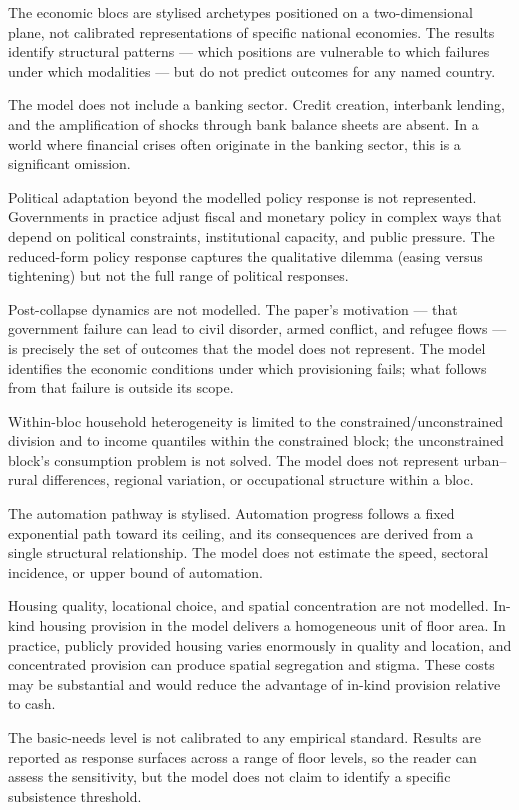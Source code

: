 \documentclass[preprint,review,12pt]{elsarticle}
\begin{document}
The economic blocs are stylised archetypes positioned on a
two-dimensional plane, not calibrated representations of specific
national economies. The results identify structural patterns --- which
positions are vulnerable to which failures under which modalities ---
but do not predict outcomes for any named country.

The model does not include a banking sector. Credit creation, interbank
lending, and the amplification of shocks through bank balance sheets are
absent. In a world where financial crises often originate in the banking
sector, this is a significant omission.

Political adaptation beyond the modelled policy response is not
represented. Governments in practice adjust fiscal and monetary policy
in complex ways that depend on political constraints, institutional
capacity, and public pressure. The reduced-form policy response captures
the qualitative dilemma (easing versus tightening) but not the full
range of political responses.

Post-collapse dynamics are not modelled. The paper's motivation --- that
government failure can lead to civil disorder, armed conflict, and
refugee flows --- is precisely the set of outcomes that the model does
not represent. The model identifies the economic conditions under which
provisioning fails; what follows from that failure is outside its scope.

Within-bloc household heterogeneity is limited to the
constrained/unconstrained division and to income quantiles within the
constrained block; the unconstrained block's consumption problem is not
solved. The model does not represent urban--rural differences, regional
variation, or occupational structure within a bloc.

The automation pathway is stylised. Automation progress follows a fixed
exponential path toward its ceiling, and its consequences are derived
from a single structural relationship. The model does not estimate the
speed, sectoral incidence, or upper bound of automation.

Housing quality, locational choice, and spatial concentration are not
modelled. In-kind housing provision in the model delivers a homogeneous
unit of floor area. In practice, publicly provided housing varies
enormously in quality and location, and concentrated provision can
produce spatial segregation and stigma. These costs may be substantial
and would reduce the advantage of in-kind provision relative to cash.

The basic-needs level is not calibrated to any empirical standard.
Results are reported as response surfaces across a range of floor
levels, so the reader can assess the sensitivity, but the model does not
claim to identify a specific subsistence threshold.
\end{document}
